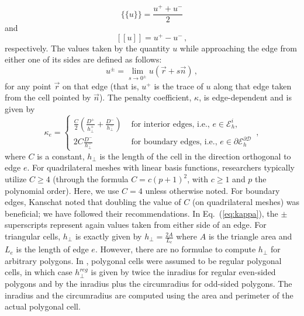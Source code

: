 \documentclass[preprint,10pt]{elsarticle}
\newcommand{\jmp}[1]{[\![#1]\!]}                     %
\newcommand{\mvl}[1]{\{\!\!\{#1\}\!\!\}}             %
\newcommand{\D}{\mathcal{D}}
\newcommand{\vr}{\vec{r}}
\newcommand{\vn}{\vec{n}}
\newcommand{\EI}{\mathcal{E}_h^i}
\newcommand{\reg}{\textit{reg}}
\newcommand{\eqt}[1]{Eq.~(\ref{#1})}                     %
\newcommand{\tf}{b}
\begin{document}
\begin{equation} \label{eq:mean}
\mvl{u} = \frac{u^+ + u^-}{2}
\end{equation}
and
\begin{equation} \label{eq:jump}
\jmp{u} = u^+ - u^- \, ,
\end{equation}
respectively.  The values taken by the quantity $u$ while approaching the edge from either one of its sides are defined as follows:
\begin{equation} \label{eq:upm}
u^\pm = \lim_{s\to 0^\pm} u(\vr + s \vn) \, ,
\end{equation}
for any point $\vr$ on that edge (that is, $u^+$ is the trace of $u$ along that edge taken from the cell pointed by $\vn$).
%
The penalty coefficient, $\kappa$, is edge-dependent and is given by
\begin{equation} \label{eq:kappa}
  \kappa_e = \left\{
    \begin{array}{ll}
      \frac{C}{2} \left( \frac{D^+}{h_\bot^+} + \frac{D^-}{h_\bot^-} \right) & \textrm{ for interior edges, i.e., } e \in \EI,\\
      2C \frac{D^-}{h_\bot^-}  & \textrm{ for boundary edges, i.e., } e \in \partial \mathcal{E}_h^{\partial\D}
    \end{array}
    \right. \, ,
\end{equation}
where $C$ is a constant, $h_{\bot}$ is the length of the cell in the direction 
orthogonal to edge $e$. 
For quadrilateral meshes with linear basis functions, researchers typically utilize $C \ge 4$ 
(through the formula $C=c(p+1)^2$, with $c\ge 1$ and $p$ the polynomial order). Here, we use $C=4$
unless otherwise noted. For boundary edges, 
Kanschat \cite{Kanschat2007} noted that doubling the value of $C$ (on quadrilateral meshes) was 
beneficial; we have followed their recommendations. In \eqt{eq:kappa}, the $\pm$ superscripts 
represent again values taken from either side of an edge. For triangular cells, $h_\bot$ is exactly 
given by $h_{\bot}=\frac{2A}{L_e}$ where $A$ is the triangle area and $L_e$ is the length of edge $e$. 
However, there are no formulae to compute $h_{\bot}$ for arbitrary polygons. In \cite{BT-PhD}, 
polygonal cells were assumed to be regular polygonal cells, in which case $h_{\bot}^\reg$ is given
by twice the inradius for regular even-sided polygons and by the inradius plus the 
circumradius for odd-sided polygons. The inradius and the circumradius are computed 
using the area and perimeter of the actual polygonal cell. 
\end{document}
